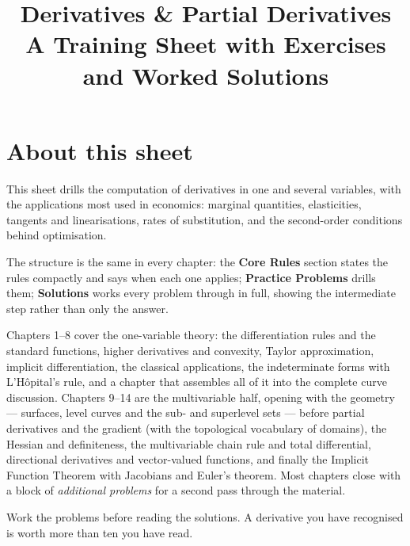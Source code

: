 \documentclass[10pt,oneside]{book}
\title{\Huge Derivatives \& Partial Derivatives\\[0.4em]
  \large A Training Sheet with Exercises and Worked Solutions}
\author{}
\date{}
\begin{document}
\frontmatter
\maketitle

\chapter*{About this sheet}

This sheet drills the computation of derivatives in one and
several variables, with the applications most used in economics: marginal quantities, elasticities, tangents and linearisations, rates of
substitution, and the second-order conditions behind optimisation.

The structure is the same in every chapter: the \textbf{Core Rules} section
states the rules compactly and says when each one applies; \textbf{Practice
Problems} drills them; \textbf{Solutions} works every problem through in
full, showing the intermediate step rather than only the answer.

Chapters 1--8 cover the one-variable theory: the differentiation rules and
the standard functions, higher derivatives and convexity, Taylor
approximation, implicit differentiation, the classical applications, the
indeterminate forms with L'H\^opital's rule, and a chapter that assembles all
of it into the complete curve discussion. Chapters 9--14 are the
multivariable half, opening with the geometry --- surfaces, level curves and
the sub- and superlevel sets --- before partial derivatives and the gradient
(with the topological vocabulary of domains), the Hessian and definiteness,
the multivariable chain rule and total differential, directional derivatives
and vector-valued functions, and finally the Implicit Function Theorem with
Jacobians and Euler's theorem. Most chapters close with a block of
\emph{additional problems} for a second pass through the material.

Work the problems before reading the solutions. A derivative you have
recognised is worth more than ten you have read.

\tableofcontents

\mainmatter














\end{document}
